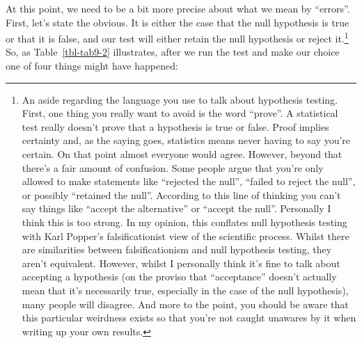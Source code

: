 \documentclass[
  a4paper,
]{book}
\begin{document}
At this point, we need to be a bit more precise about what we mean by
``errors''. First, let's state the obvious. It is either the case that
the null hypothesis is true or that it is false, and our test will
either retain the null hypothesis or reject it.\footnote{An aside
  regarding the language you use to talk about hypothesis testing.
  First, one thing you really want to avoid is the word ``prove''. A
  statistical test really doesn't prove that a hypothesis is true or
  false. Proof implies certainty and, as the saying goes, statistics
  means never having to say you're certain. On that point almost
  everyone would agree. However, beyond that there's a fair amount of
  confusion. Some people argue that you're only allowed to make
  statements like ``rejected the null'', ``failed to reject the null'',
  or possibly ``retained the null''. According to this line of thinking
  you can't say things like ``accept the alternative'' or ``accept the
  null''. Personally I think this is too strong. In my opinion, this
  conflates null hypothesis testing with Karl Popper's falsificationist
  view of the scientific process. Whilst there are similarities between
  falsificationism and null hypothesis testing, they aren't equivalent.
  However, whilst I personally think it's fine to talk about accepting a
  hypothesis (on the proviso that ``acceptance'' doesn't actually mean
  that it's necessarily true, especially in the case of the null
  hypothesis), many people will disagree. And more to the point, you
  should be aware that this particular weirdness exists so that you're
  not caught unawares by it when writing up your own results.} So, as
Table~\ref{tbl-tab9-2} illustrates, after we run the test and make our
choice one of four things might have happened:

\hypertarget{tbl-tab9-2}{}
 
  \providecommand{\huxb}[2]{\arrayrulecolor[RGB]{#1}\global\arrayrulewidth=#2pt}
  \providecommand{\huxvb}[2]{\color[RGB]{#1}\vrule width #2pt}
  \providecommand{\huxtpad}[1]{\rule{0pt}{#1}}
  \providecommand{\huxbpad}[1]{\rule[-#1]{0pt}{#1}}
\end{document}
